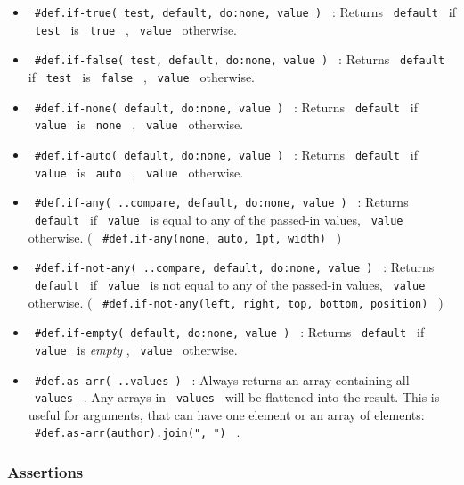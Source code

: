 \begin{itemize}
\tightlist
\item
  \texttt{\ \#def.if-true(\ test,\ default,\ do:none,\ value\ )\ } :
  Returns \texttt{\ default\ } if \texttt{\ test\ } is \texttt{\ true\ }
  , \texttt{\ value\ } otherwise.
\item
  \texttt{\ \#def.if-false(\ test,\ default,\ do:none,\ value\ )\ } :
  Returns \texttt{\ default\ } if \texttt{\ test\ } is
  \texttt{\ false\ } , \texttt{\ value\ } otherwise.
\item
  \texttt{\ \#def.if-none(\ default,\ do:none,\ value\ )\ } : Returns
  \texttt{\ default\ } if \texttt{\ value\ } is \texttt{\ none\ } ,
  \texttt{\ value\ } otherwise.
\item
  \texttt{\ \#def.if-auto(\ default,\ do:none,\ value\ )\ } : Returns
  \texttt{\ default\ } if \texttt{\ value\ } is \texttt{\ auto\ } ,
  \texttt{\ value\ } otherwise.
\item
  \texttt{\ \#def.if-any(\ ..compare,\ default,\ do:none,\ value\ )\ } :
  Returns \texttt{\ default\ } if \texttt{\ value\ } is equal to any of
  the passed-in values, \texttt{\ value\ } otherwise. (
  \texttt{\ \#def.if-any(none,\ auto,\ 1pt,\ width)\ } )
\item
  \texttt{\ \#def.if-not-any(\ ..compare,\ default,\ do:none,\ value\ )\ }
  : Returns \texttt{\ default\ } if \texttt{\ value\ } is not equal to
  any of the passed-in values, \texttt{\ value\ } otherwise. (
  \texttt{\ \#def.if-not-any(left,\ right,\ top,\ bottom,\ position)\ }
  )
\item
  \texttt{\ \#def.if-empty(\ default,\ do:none,\ value\ )\ } : Returns
  \texttt{\ default\ } if \texttt{\ value\ } is \emph{empty} ,
  \texttt{\ value\ } otherwise.
\item
  \texttt{\ \#def.as-arr(\ ..values\ )\ } : Always returns an array
  containing all \texttt{\ values\ } . Any arrays in \texttt{\ values\ }
  will be flattened into the result. This is useful for arguments, that
  can have one element or an array of elements:
  \texttt{\ \#def.as-arr(author).join(",\ ")\ } .
\end{itemize}

\subsubsection{Assertions}\label{assertions}

\begin{Shaded}
\begin{Highlighting}[]
\OperatorTok{:}
\end{Highlighting}
\end{Shaded}

